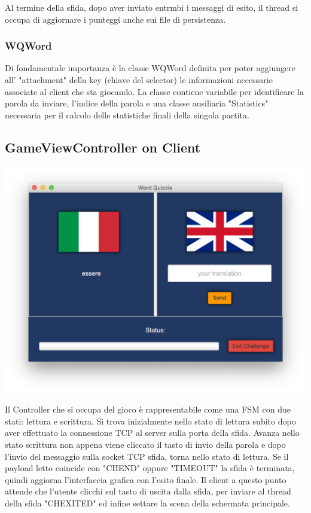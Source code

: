 \documentclass{article}
\begin{document}
Al termine della sfida, dopo aver inviato entrmbi i messaggi di esito, il thread si occupa di aggiornare i punteggi anche sui file di persistenza.

\subsubsection{WQWord}
Di fondamentale importanza è la classe WQWord definita per poter aggiungere all' "attachment" della key (chiave del selector) le informazioni necessarie associate al client che sta giocando. La classe contiene variabile per identificare la parola da inviare, l'indice della parola e una classe ausiliaria "Statistics" necessaria per il calcolo delle statistiche finali della singola partita.

\subsection{GameViewController on Client}
\begin{center}
\includegraphics[scale=0.5]{quizzlegame.png}
\end{center}
Il Controller che si occupa del gioco è rappresentabile come una FSM con due stati: lettura e scrittura. Si trova inizialmente nello stato di lettura subito dopo aver effettuato la connessione TCP al server sulla porta della sfida. Avanza nello stato scrittura non appena viene cliccato il tasto di invio della parola e dopo l'invio del messaggio sulla socket TCP sfida, torna nello stato di lettura. Se il payload letto coincide con "CHEND" oppure "TIMEOUT" la sfida è terminata, quindi aggiorna l'interfaccia grafica con l'esito finale. Il client a questo punto attende che l'utente clicchi sul tasto di uscita dalla sfida, per inviare al thread della sfida "CHEXITED" ed infine settare la scena della schermata principale.



\end{document}
